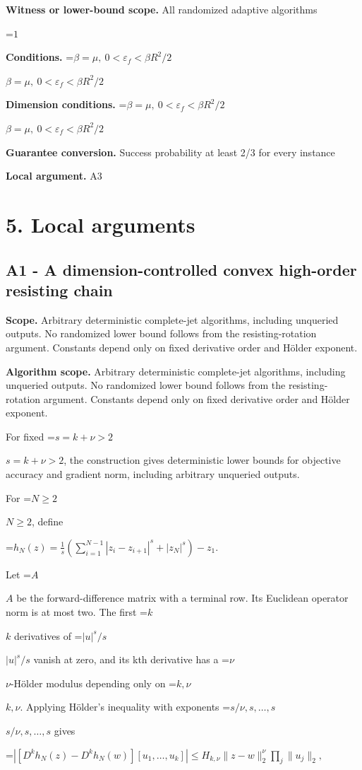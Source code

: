 \documentclass[10pt,a4paper]{article}
\newcommand{\AtlasMath}[1]{\par\begingroup\centering\setbox0=\hbox{$\displaystyle #1$}\ifdim\wd0>1.4\linewidth\typeout{ATLAS WIDE FORMULA: \the\wd0}\fi\ifdim\wd0>\linewidth\resizebox{\linewidth}{!}{\box0}\else\box0\fi\par\endgroup}
\newcommand{\AtlasInlineMath}[1]{\begingroup\setbox0=\hbox{$#1$}\ifdim\wd0>.4\linewidth\endgroup\AtlasMath{#1}\else\endgroup$#1$\fi}
\begin{document}
\textbf{Witness or lower-bound scope.} All randomized adaptive algorithms

\AtlasMath{1}
\textbf{Conditions.} \AtlasInlineMath{\beta=\mu,\ 0<\varepsilon_f<\beta R^2/2}

\textbf{Dimension conditions.} \AtlasInlineMath{\beta=\mu,\ 0<\varepsilon_f<\beta R^2/2}

\textbf{Guarantee conversion.} Success probability at least 2/3 for every instance

\textbf{Local argument.} A3

\section{5. Local arguments}
\subsection{A1 - A dimension-controlled convex high-order resisting chain}
\textbf{Scope.} Arbitrary deterministic complete-jet algorithms, including unqueried outputs. No randomized lower bound follows from the resisting-rotation argument. Constants depend only on fixed derivative order and Hölder exponent.

\textbf{Algorithm scope.} Arbitrary deterministic complete-jet algorithms, including unqueried outputs. No randomized lower bound follows from the resisting-rotation argument. Constants depend only on fixed derivative order and Hölder exponent.

For fixed \AtlasInlineMath{s=k+\nu>2}, the construction gives deterministic lower bounds for objective accuracy and gradient norm, including arbitrary unqueried outputs.

For \AtlasInlineMath{N\ge2}, define

\AtlasMath{h_N(z)=\frac1s\left(\sum_{i=1}^{N-1}|z_i-z_{i+1}|^s+|z_N|^s\right)-z_1.}

Let \AtlasInlineMath{A} be the forward-difference matrix with a terminal row. Its Euclidean operator norm is at most two. The first \AtlasInlineMath{k} derivatives of \AtlasInlineMath{|u|^s/s} vanish at zero, and its kth derivative has a \AtlasInlineMath{\nu}-Hölder modulus depending only on \AtlasInlineMath{k,\nu}. Applying Hölder's inequality with exponents \AtlasInlineMath{s/\nu,s,\ldots,s} gives

\AtlasMath{|[D^kh_N(z)-D^kh_N(w)][u_1,\ldots,u_k]|
\le H_{k,\nu}\|z-w\|_2^\nu\prod_j\|u_j\|_2,}
\end{document}
